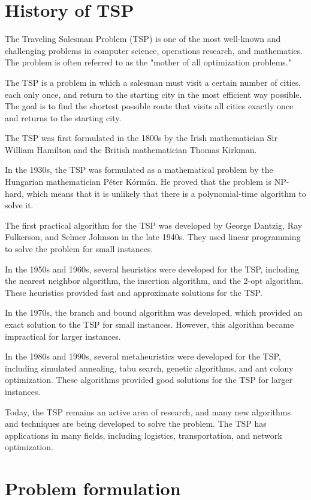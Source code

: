 \section{History of TSP}
The Traveling Salesman Problem (TSP) is one of the most well-known and challenging problems in computer science, operations research, and mathematics. The problem is often referred to as the "mother of all optimization problems."

The TSP is a problem in which a salesman must visit a certain number of cities, each only once, and return to the starting city in the most efficient way possible. The goal is to find the shortest possible route that visits all cities exactly once and returns to the starting city.

The TSP was first formulated in the 1800s by the Irish mathematician Sir William Hamilton and the British mathematician Thomas Kirkman. 

In the 1930s, the TSP was formulated as a mathematical problem by the Hungarian mathematician Péter Kórmán. He proved that the problem is NP-hard, which means that it is unlikely that there is a polynomial-time algorithm to solve it.

The first practical algorithm for the TSP was developed by George Dantzig, Ray Fulkerson, and Selmer Johnson in the late 1940s. They used linear programming to solve the problem for small instances.

In the 1950s and 1960s, several heuristics were developed for the TSP, including the nearest neighbor algorithm, the insertion algorithm, and the 2-opt algorithm. These heuristics provided fast and approximate solutions for the TSP.

In the 1970s, the branch and bound algorithm was developed, which provided an exact solution to the TSP for small instances. However, this algorithm became impractical for larger instances.

In the 1980s and 1990s, several metaheuristics were developed for the TSP, including simulated annealing, tabu search, genetic algorithms, and ant colony optimization. These algorithms provided good solutions for the TSP for larger instances.

Today, the TSP remains an active area of research, and many new algorithms and techniques are being developed to solve the problem. The TSP has applications in many fields, including logistics, transportation, and network optimization.

\section{Problem formulation}

